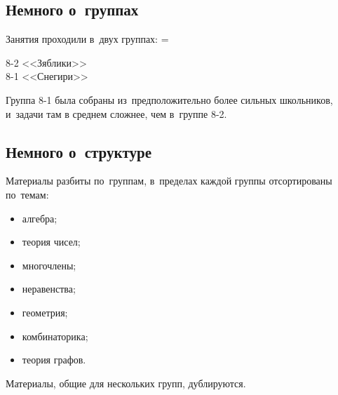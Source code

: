 


\begingroup
\providecommand\ifsourcelinks{\iffalse}
\providecommand\url{\texttt}

\strut

\vfill

\begin{center}
\end{center}

\vfill

\strut

\clearpage


\subsection*{Немного о~группах}

Занятия проходили в~двух группах:
\begingroup\multicolsep=\parskip
\begin{multicols}{2}
8-2  <<Зяблики>>
\\
8-1  <<Снегири>>
\end{multicols}
\endgroup

Группа \mbox{8-1} была собраны из~предположительно более сильных школьников,
и~задачи там в среднем сложнее, чем в~группе \mbox{8-2}.


\subsection*{Немного о~структуре}

Материалы разбиты по~группам, в~пределах каждой группы отсортированы по~темам:
\begin{itemize}
    \item алгебра;
    \item теория чисел;
    \item многочлены;
    \item неравенства;
\smallskip
    \item геометрия;
\smallskip
    \item комбинаторика;
    \item теория графов.
\end{itemize}


Материалы, общие для нескольких групп, дублируются.
\ifsourcelinks
Все материалы сопровождаются ссылками на~исходные файлы \LaTeX.
\fi

\endgroup %

